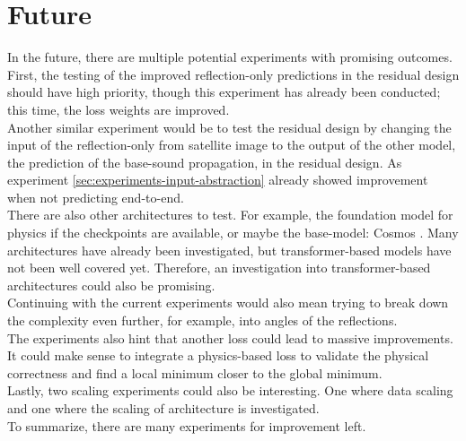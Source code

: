 	\section{Future}
	\label{sec:sum-future}
		In the future, there are multiple potential experiments with promising outcomes.\\
		First, the testing of the improved reflection-only predictions in the residual design should have high priority, though this experiment has already been conducted; this time, the loss weights are improved.\\
		Another similar experiment would be to test the residual design by changing the input of the reflection-only from satellite image to the output of the other model, the prediction of the base-sound propagation, in the residual design. As experiment \ref{sec:experiments-input-abstraction} already showed improvement when not predicting end-to-end.\\
		There are also other architectures to test. For example, the foundation model for physics if the checkpoints are available, or maybe the base-model: Cosmos \cite{nvidia2025cosmosworldfoundationmodel}.
		\clearpage
		Many architectures have already been investigated, but transformer-based models have not been well covered yet. Therefore, an investigation into transformer-based architectures could also be promising.\\
		Continuing with the current experiments would also mean trying to break down the complexity even further, for example, into angles of the reflections. \\
		The experiments also hint that another loss could lead to massive improvements. It could make sense to integrate a physics-based loss to validate the physical correctness and find a local minimum closer to the global minimum.\\
		Lastly, two scaling experiments could also be interesting. One where data scaling and one where the scaling of architecture is investigated.\\
		To summarize, there are many experiments for improvement left.
	
	
	